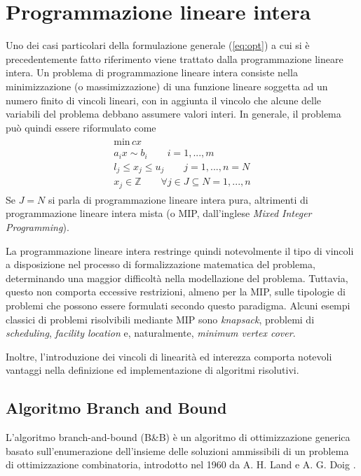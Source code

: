 \section{Programmazione lineare intera}
Uno dei casi particolari della formulazione generale (\ref{eq:opt}) a cui si è precedentemente fatto riferimento viene trattato dalla 
programmazione lineare intera.
Un problema di programmazione lineare intera consiste nella minimizzazione (o massimizzazione) di una funzione lineare soggetta ad un 
numero finito di vincoli lineari, con in aggiunta il vincolo che alcune delle variabili del problema debbano assumere valori interi. 
In generale, il problema può quindi essere riformulato come
\begin{align*}
	\label{eq:linprog}
	\begin{array}{l}
      \text{min} \, cx\\
      a_i x \sim b_i \qquad i=1,...,m \\
      l_j \leq x_j \leq u_j \qquad j=1,...,n =N \\
      x_j \in \mathbb{Z}  \qquad \forall j \in J \subseteq N = {1,...,n}	
	\end{array}
\end{align*}
\indent
Se $J=N$ si parla di programmazione lineare intera pura, altrimenti di programmazione lineare intera mista (o MIP, dall'inglese 
\textit{Mixed Integer Programming}).

La programmazione lineare intera restringe quindi notevolmente il tipo di vincoli a disposizione nel
processo di formalizzazione matematica del problema, determinando una maggior difficoltà nella modellazione del problema.
Tuttavia, questo non comporta eccessive restrizioni, almeno per la MIP, sulle tipologie di problemi che possono essere formulati 
secondo questo paradigma. Alcuni esempi classici di problemi risolvibili mediante MIP sono \textit{knapsack}, problemi di 
\textit{scheduling}, \textit{facility location} e, naturalmente, \textit{minimum vertex cover}.

Inoltre, l'introduzione dei vincoli di linearità ed interezza comporta notevoli vantaggi nella definizione ed
implementazione di algoritmi risolutivi. 

\subsection{Algoritmo Branch and Bound}
L'algoritmo branch-and-bound (B\&B) è un algoritmo di ottimizzazione generica basato sull'enumerazione dell'insieme delle soluzioni
ammissibili di un problema di ottimizzazione combinatoria, introdotto nel 1960 da A. H. Land e A. G. Doig \cite{10.2307/1910129}. 


